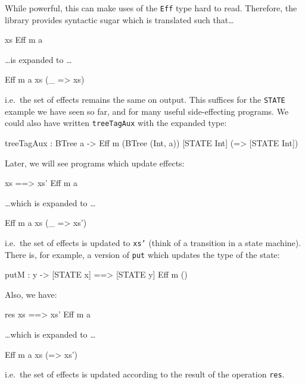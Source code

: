 \noindent
While powerful, this can make uses of the \texttt{Eff} type hard to read.
Therefore, the \effects{} library provides syntactic sugar which is translated such that\ldots

\begin{code}
{ xs } Eff m a 
\end{code}

\ldots is expanded to \ldots

\begin{code}
Eff m a xs (\_ => xs)
\end{code}

\noindent
i.e.\ the set of effects remains the same on output.
This suffices for the \texttt{STATE} example we have seen so far, and for many useful side-effecting programs.
We could also have written \texttt{treeTagAux} with the expanded type:

\begin{code}
treeTagAux : BTree a -> 
             Eff m (BTree (Int, a)) [STATE Int] (\x => [STATE Int])
\end{code}

\noindent
Later, we will see programs which update effects:

\begin{code}
{ xs ==> xs' } Eff m a
\end{code}

\ldots which is expanded to \ldots

\begin{code}
Eff m a xs (\_ => xs')
\end{code}

\noindent
i.e.\ the set of effects is updated to \texttt{xs'} (think of a transition in a state machine).
There is, for example, a version of \texttt{put} which updates the type of the state:

\begin{code}
putM : y -> { [STATE x] ==> [STATE y] } Eff m () 
\end{code}

\noindent
Also, we have:

\begin{code}
{ {res} xs ==> xs' } Eff m a
\end{code}

\ldots which is expanded to \ldots

\begin{code}
Eff m a xs (\res => xs')
\end{code}

\noindent
i.e.\ the set of effects is updated according to the result of the operation \texttt{res}.

